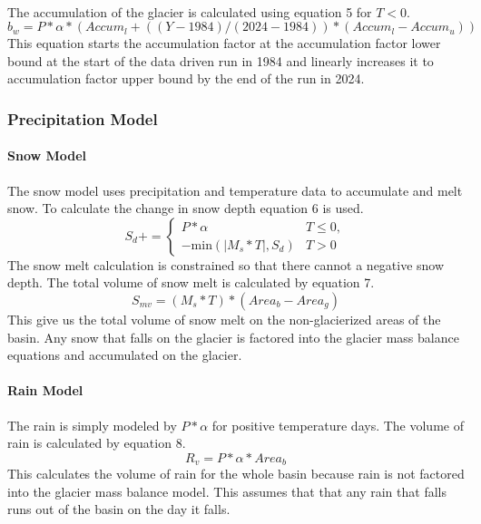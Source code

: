 \documentclass{article}
\begin{document}
\paragraph{}
The accumulation of the glacier is calculated using equation 5 for $T<0$.
\begin{equation}b_w=P*\alpha*({Accum}_{l}+((Y-1984)/(2024-1984))*({Accum}_{l}-{Accum}_{u}))\label{tab:winter_mb_eq}\end{equation}
This equation starts the accumulation factor at the accumulation factor lower bound at the start of the data driven run in 1984 and linearly 
increases it to accumulation factor upper bound by the end of the run in 2024.

\subsubsection{Precipitation Model}
\paragraph{Snow Model}
The snow model uses precipitation and temperature data to accumulate and melt snow. To calculate the change in snow depth equation 6 is used.
\begin{equation}S_{d} += 
\begin{cases} 
  P*\alpha & T \leq 0,\\
  -\text{min}(|M_{s}*T|,S_{d}) &  T > 0
\end{cases}\label{tab:snow_depth_eq}\end{equation}
The snow melt calculation is constrained so that there cannot a negative snow depth. 
The total volume of snow melt is calculated by equation 7.
\begin{equation}S_{mv}=(M_{s}*T)*({Area}_{b}-{Area}_{g})\label{tab:snow_melt_eq}\end{equation}
This give us the total volume of snow melt on the non-glacierized areas of the basin. Any snow that falls on the glacier is factored into 
the glacier mass balance equations and accumulated on the glacier.
\paragraph{Rain Model}
The rain is simply modeled by $P*\alpha$ for positive temperature days. The volume of rain is calculated by equation 8.
\begin{equation}R_{v}=P*\alpha*{Area}_{b}\label{tab:rain_vol_eq}\end{equation}
This calculates the volume of rain for the whole basin because rain is not factored into the glacier mass balance model. This assumes that  that any rain 
that falls runs out of the basin on the day it falls.
\end{document}
